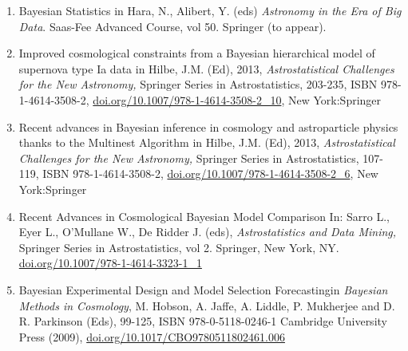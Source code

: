 \begin{enumerate}


\item 
{}
{Bayesian Statistics}
in Hara, N., Alibert, Y. (eds)  {\em Astronomy in the Era of Big Data}. Saas-Fee Advanced Course, vol 50. Springer (to appear).

\item
{}
{Improved cosmological constraints from a Bayesian hierarchical model of supernova type Ia data}
in Hilbe, J.M. (Ed),  2013,  {\em Astrostatistical Challenges for the New Astronomy,} Springer Series in Astrostatistics, 203-235, ISBN 978-1-4614-3508-2, \href{https://doi.org/10.1007/978-1-4614-3508-2_10}{doi.org/10.1007/978-1-4614-3508-2\_10}, New York:Springer
 
\item 
{}
{Recent advances in Bayesian inference in cosmology and astroparticle physics thanks to the Multinest Algorithm}
in Hilbe, J.M. (Ed),  2013,  {\em Astrostatistical Challenges for the New Astronomy,} Springer Series in Astrostatistics, 107-119, ISBN 978-1-4614-3508-2, \href{https://doi.org/10.1007/978-1-4614-3508-2_6}{doi.org/10.1007/978-1-4614-3508-2\_6}, New York:Springer

\item 
{}
{Recent Advances in Cosmological Bayesian Model Comparison}
In: Sarro L., Eyer L., O'Mullane W., De Ridder J. (eds),  {\em Astrostatistics and Data Mining,} Springer Series in Astrostatistics, vol 2. Springer, New York, NY. \href{https://doi.org/10.1007/978-1-4614-3323-1_1}{doi.org/10.1007/978-1-4614-3323-1\_1}
 
\item 
{}
{Bayesian Experimental Design and Model Selection Forecasting}{in {\em Bayesian Methods in Cosmology}, M. Hobson, A. Jaffe, A. Liddle, P. Mukherjee and D. R. Parkinson (Eds), 99-125, ISBN 978-0-5118-0246-1 Cambridge University Press (2009), \href{https://doi.org/10.1017/CBO9780511802461.006}{doi.org/10.1017/CBO9780511802461.006}}

\end{enumerate}
\setcounter{nBookChapters}{\value{enumi}}

\vspace{\baselineskip}

